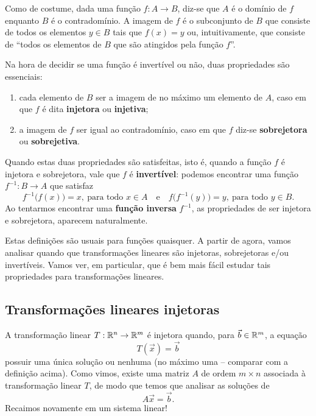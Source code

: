 \documentclass[../livro.tex]{subfiles}
\begin{document}
Como de costume, dada uma função $f: A \to B$, diz-se que $A$ é o domínio de $f$ enquanto $B$ é o contradomínio. A imagem de $f$ é o subconjunto de $B$ que consiste de todos os elementos $y \in B$ tais que $f(x) = y$ ou, intuitivamente, que consiste de ``todos os elementos de $B$ que são atingidos pela função $f$''.

Na hora de decidir se uma função é invertível ou não, duas propriedades são essenciais:
\begin{enumerate}[$1)$]
  \item cada elemento de $B$ ser a imagem de no máximo um elemento de $A$, caso em que $f$ é dita \textbf{injetora} ou \textbf{injetiva};
  \item a imagem de $f$ ser igual ao contradomínio, caso em que $f$ diz-se \textbf{sobrejetora} ou \textbf{sobrejetiva}.
\end{enumerate}

Quando estas duas propriedades são satisfeitas, isto é, quando a função $f$ é injetora e sobrejetora, vale que $f$ é \textbf{invertível}: podemos encontrar uma função $f^{-1} : B \to A$ que satisfaz
\begin{equation}
f^{-1}\big( f (x)\big) = x, \ \text{para todo } x \in A  \quad \text{e} \quad f\big( f^{-1} (y)\big) = y, \ \text{para todo } y \in B.
\end{equation} Ao tentarmos encontrar uma \textbf{função inversa} $f^{-1}$, as propriedades de ser injetora e sobrejetora, aparecem naturalmente.

Estas definições são usuais para funções quaisquer. A partir de agora, vamos analisar quando que transformações lineares são injetoras, sobrejetoras e/ou invertíveis. Vamos ver, em particular, que é bem mais fácil estudar tais propriedades para transformações lineares.

\subsection{Transformações lineares injetoras}

A transformação linear $T: \mathbb{R}^n \to \mathbb{R}^m$ é injetora quando, para $\vec{b} \in \mathbb{R}^m$, a equação
\begin{equation}
T(\vec{x}) = \vec{b}
\end{equation} possuir uma única solução ou nenhuma (no máximo uma -- comparar com a definição acima). Como vimos, existe uma matriz $A$ de ordem $m\times n$ associada à transformação linear $T$, de modo que temos que analisar as soluções de
\begin{equation}
A\vec{x} = \vec{b}.
\end{equation} Recaimos novamente em um sistema linear!
\end{document}
